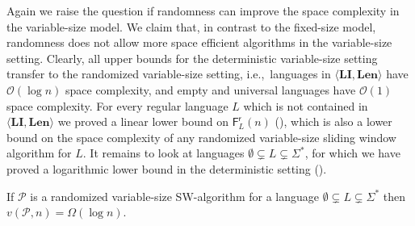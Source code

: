 \documentclass{theoretics}
\renewcommand{\O}{\mathcal{O}}
\renewcommand{\P}{\mathcal{P}}
\newcommand{\F}{\mathsf{F}}
\renewcommand{\r}{\mathsf{r}}
\newcommand{\Len}{\mathbf{Len}}
\newcommand{\LI}{\mathbf{LI}}
\begin{document}
Again we raise the question if randomness can improve the space complexity in the variable-size model.
We claim that, in contrast to the fixed-size model, randomness does not allow more space efficient
algorithms in the variable-size setting. 
Clearly, all upper bounds for the deterministic variable-size setting transfer to the randomized
variable-size setting,
i.e.,~languages in $\langle \LI, \Len \rangle$ have $\O(\log n)$ space complexity,
and empty and universal languages have $\O(1)$ space complexity.
For every regular language $L$ which is not contained in $\langle \LI, \Len \rangle$
we proved a linear lower bound on $\F^\r_L(n)$ (),
which is also a lower bound on the space complexity of any randomized variable-size sliding window algorithm for $L$.
It remains to look at languages $\emptyset \subsetneq L \subsetneq \Sigma^*$,
for which we have proved a logarithmic lower bound
in the deterministic setting ().

\begin{lemma}
	\label{lem:rand-length-lb}
	If $\P$ is a randomized variable-size SW-algorithm 
	for a language $\emptyset \subsetneq L \subsetneq \Sigma^*$
	then $v(\P,n) = \Omega(\log n)$.
\end{lemma}
\end{document}
